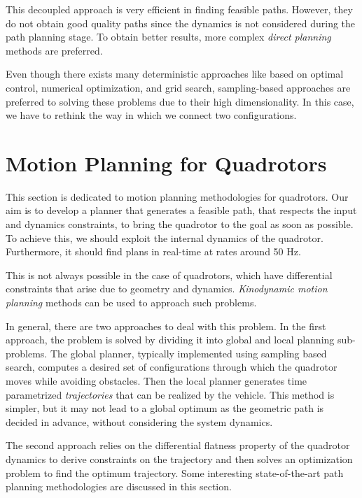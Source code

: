 This decoupled approach is very efficient in finding feasible paths. However, they do not obtain good quality paths since the dynamics is not considered during the path planning stage. To obtain better results, more complex \textit{direct planning} methods are preferred. 

Even though there exists many deterministic approaches like based on optimal control, numerical optimization, and grid search, sampling-based approaches are preferred to solving these problems due to their high dimensionality. In this case, we have to rethink the way in which we connect two configurations. 

\section{Motion Planning for Quadrotors}
\label{sec:planning_quadrotors}
This section is dedicated to motion planning methodologies for quadrotors. 
Our aim is to develop a planner that generates a feasible path, that respects the input and dynamics constraints, to bring the quadrotor to the goal as soon as possible. To achieve this, we should exploit the internal dynamics of the quadrotor. Furthermore, it should find plans in real-time at rates around 50 Hz. 

 This is not always possible in the case of quadrotors, which have differential constraints that arise due to geometry and dynamics. \textit{Kinodynamic motion planning} \cite{donald1993kinodynamic} methods can be used to approach such problems. 

In general, there are two approaches to deal with this problem. In the first approach, the problem is solved by dividing it into global and local planning sub-problems. The global planner, typically implemented using sampling based search, computes a desired set of configurations through which the quadrotor moves while avoiding obstacles. Then the local planner generates time parametrized \textit{trajectories} that can be realized by the vehicle. This method is simpler, but it may not lead to a global optimum as the geometric path is decided in advance, without considering the system dynamics. 

The second approach relies on the differential flatness \cite{mellinger2011minimum} property of the quadrotor dynamics to derive constraints on the trajectory and then solves an optimization problem to find the optimum trajectory. Some interesting state-of-the-art path planning methodologies are discussed in this section. 

